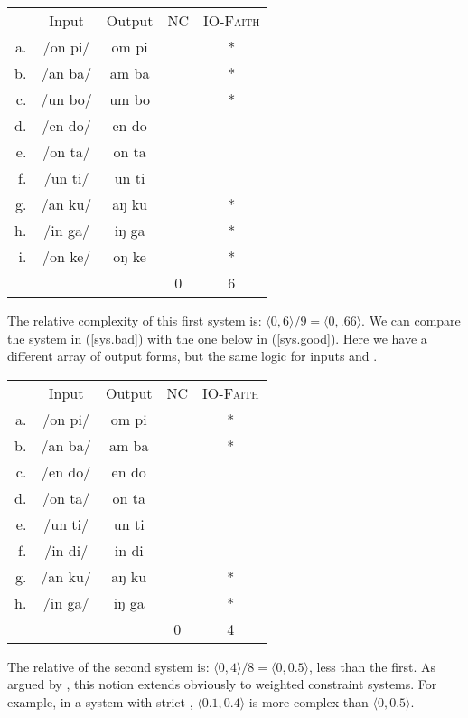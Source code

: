\documentclass[output=paper,
modfonts
]{LSP/langsci}
\begin{document}
\ea
\label{sys.bad}
\begin{tabular}[t]{rc|c|c|c}
   & Input   & Output & NC & \textsc{IO-Faith} \\
\cline{2-5}
a. & /on pi/ & om pi  &    & * \\
b. & /an ba/ & am ba  &    & * \\
c. & /un bo/ & um bo  &    & * \\
d. & /en do/ & en do  &    & \\
e. & /on ta/ & on ta  &    & \\
f. & /un ti/ & un ti  &    & \\
g. & /an ku/ & aŋ ku  &    & * \\
h. & /in ga/ & iŋ ga  &    & * \\
i. & /on ke/ & oŋ ke  &    & * \\
\cline{2-5}
   &         &        & 0  & 6
\end{tabular}
\z

\noindent The relative complexity of this first system is: $\langle0,6\rangle/9 = \langle0,.66\rangle$. We can compare the system in (\ref{sys.bad}) with the one below in (\ref{sys.good}). Here we have a different array of output forms, but the same logic for inputs and .

\ea
\label{sys.good}
\begin{tabular}[t]{rc|c|c|c}
   & Input   & Output & NC & \textsc{IO-Faith} \\
\cline{2-5}
a. & /on pi/ & om pi  &    & * \\
b. & /an ba/ & am ba  &    & * \\
c. & /en do/ & en do  &    & \\
d. & /on ta/ & on ta  &    & \\
e. & /un ti/ & un ti  &    & \\
f. & /in di/ & in di  &    & \\
g. & /an ku/ & aŋ ku  &    & * \\
h. & /in ga/ & iŋ ga  &    & * \\
\cline{2-5}
   &         &        & 0  & 4
\end{tabular}
\z

\noindent The relative  of the second system is: $\langle0,4\rangle/8 = \langle0,0.5\rangle$, less than the first. As argued by \citet{inopt.phon}, this notion extends obviously to weighted constraint systems. For example, in a system with strict , $\langle0.1,0.4\rangle$ is more complex than $\langle0,0.5\rangle$.
\end{document}

